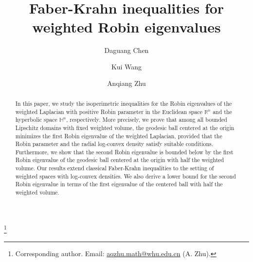 \documentclass[11pt,leqno]{amsart}
\numberwithin{equation}{section}
\begin{document}
\title[Faber-Krahn  inequalities for weighted Robin eigenvalues]{Faber-Krahn  inequalities for weighted Robin eigenvalues}

\author{Daguang Chen} 
\address{Department of Mathematical Sciences,
Tsinghua University,
Beijing 100084,
China}

\author{Kui Wang} 
\address{School of Mathematical Sciences, Soochow University, Suzhou, 215006, China}

\author{Anqiang Zhu}
\address{School of Mathematics and Statistics, Wuhan University, Wuhan 430072, China}
\thanks{Corresponding author. Email: \href{mailto:aqzhu.math@whu.edu.cn}{aqzhu.math@whu.edu.cn} (A. Zhu).}

\begin{abstract}
In this paper, we study the isoperimetric  inequalities for the Robin eigenvalues of the weighted Laplacian with positive Robin parameter in the Euclidean space $\mathbb{R}^n$ and  the hyperbolic space $\mathbb{H}^n$, respectively. More precisely, we prove that among all bounded Lipschitz domains with fixed weighted volume, the geodesic ball centered at the origin minimizes the first Robin eigenvalue of the weighted Laplacian, provided that the Robin parameter and the radial log-convex density satisfy suitable conditions. Furthermore, we show that the second Robin eigenvalue is bounded below by the first Robin eigenvalue of the geodesic ball centered at the origin with half the weighted volume. Our results extend classical Faber-Krahn  inequalities to the setting of weighted spaces with log-convex densities.  We also derive a lower
bound for the second Robin eigenvalue in terms of the first
eigenvalue of the centered ball with half the weighted volume.
\end{abstract}



\maketitle
\end{document}
